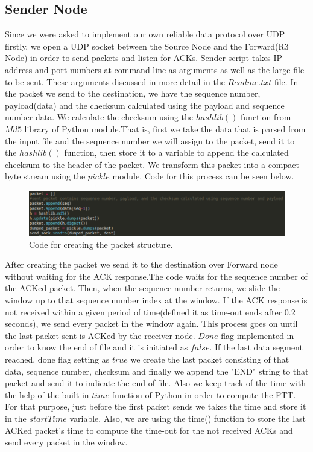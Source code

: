 \documentclass[conference]{IEEEtran}
\begin{document}
\subsection{Sender Node}
Since we were asked to implement our own reliable data protocol over UDP firstly, we open a UDP socket between the Source Node and the Forward(R3 Node) in order to send packets and listen for ACKs. Sender script takes IP address and port numbers at command line as arguments as well as the large file to be sent. These arguments discussed in more detail in the $Readme.txt$ file.  In the packet we send to the destination, we have the sequence number, payload(data) and the checksum calculated using the payload and sequence number data. We calculate the checksum using the  $hashlib()$ function from $Md5$ library of Python module.That is, first we take the data that is parsed from the input file and the sequence number we will assign to the packet, send it to the $hashlib()$ function, then store it to a variable to append the calculated checksum to the header of the packet. We transform this packet into a compact byte stream using the $pickle$ module. Code for this process can be seen below.

\begin{figure}[H]
  \includegraphics[width=\linewidth]{packet_structure.png}
  \caption{Code for creating the packet structure.}
  \label{fig:packet}
\end{figure}

After creating the packet we send it to the destination over Forward node without waiting for the ACK response.The code waits for the sequence number of the ACKed packet. Then, when the sequence number returns, we slide the window up to that sequence number index at the window. If the ACK response is not received within a given period of time(defined it as time-out ends after 0.2 seconds), we send every packet in the window again. This process goes on until the last packet sent is ACKed by the receiver node. $Done$ flag implemented in order to know the end of file and it is initiated as $false$. If the last data segment reached, done flag setting as $true$ we create the last packet consisting of that data, sequence number, checksum and finally we append the "END" string to that packet and send it to indicate the end of file. Also we keep track of the time  with the help of the built-in $time$ function of Python in order to compute the FTT. For that purpose, just before the first packet sends we takes the time and store it in the $startTime$ variable. Also, we are using the time() function to store the last ACKed packet's time to compute the time-out for the not received ACKs and send every packet in the window. 
\end{document}
